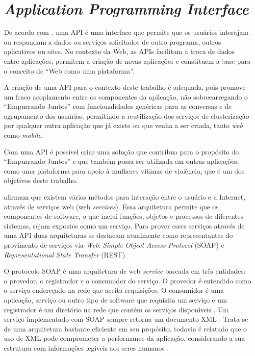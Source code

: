 \chapter{\textit{Application Programming Interface}} \label{cap:api}

De acordo com , uma API é uma interface que permite que os 
usuários interajam ou respondam a dados ou serviços solicitados de outro programa, outros
aplicativos ou sites. No contexto da Web, as APIs facilitam a troca de dados entre 
aplicações, permitem a criação de novas aplicações e constituem a base para o conceito de 
``Web como uma plataforma''.

A criação de uma API para o contexto deste trabalho é adequada, pois promove um fraco acoplamento
entre os componentes da aplicação, não sobrecarregando o ``Empurrando Juntos'' com funcionalidades genéricas
para as conversas e de agrupamento dos usuários,
permitindo a reutilização dos serviços de clusterização por qualquer
outra aplicação que já existe ou que venha a ser criada, tanto \textit{web} como \textit{mobile}.

Com uma API é possível criar uma solução que contribua para o propósito do ``Empurrando Juntos'' e que também
possa ser utilizada em outras aplicações, como uma plataforma para apoio à mulheres vítimas de violência, que é
um dos objetivos deste trabalho.

 afirmam que existem vários métodos para interação entre o  
usuário e a Internet, através de serviços web (web \textit{services}).
Essa arquitetura permite que os componentes de software, o que inclui funções,
objetos e processos de diferentes sistemas, sejam expostos como um serviço. Para prover esses serviços através de uma API duas arquiteturas se destacam atualmente como representantes do provimento
de serviços via \textit{Web}: \textit{Simple Object Access Protocol} (SOAP) e \textit{Representational State Transfer} (REST).

O protocolo SOAP é uma arquitetura de web \textit{service} baseada em três entidades: o provedor, o registrador e o consumidor do serviço.
O provedor é entendido como o serviço endereçado na rede
que aceita requisições. O consumidor é uma aplicação, serviço ou outro tipo de software que
requisita um serviço e um registrador é um diretório na rede que contém os serviços disponíveis \cite{mumbaikar}.
Um serviço implementado com SOAP sempre retorna um documento XML \cite{wagh2012comparative}. Trata-se de uma arquitetura 
bastante eficiente em seu propósito, 
todavia é relatado que o uso de XML pode comprometer a performance da aplicação, considerando a sua estrutura com informações 
legíveis aos seres humanos \cite{wagh2012comparative, soap_and_ws}.

